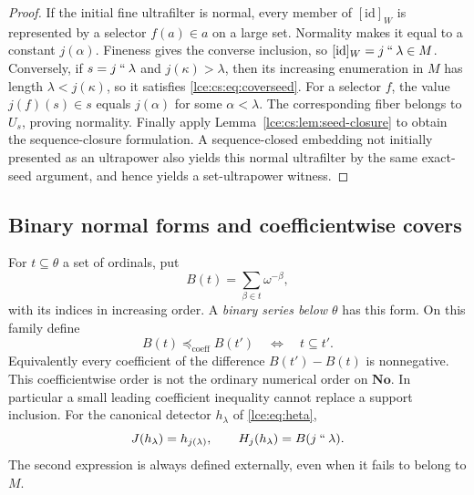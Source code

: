 \documentclass[11pt,letterpaper]{article}
\numberwithin{equation}{section}
\theoremstyle{definition}
\theoremstyle{remark}
\newcommand{\No}{\mathbf{No}}
\newcommand{\imset}[2]{#1\mathbin{``}#2}
\newcommand{\leref}[1]{Lemma~\ref{#1}}
\newcommand{\lecoeff}{\preccurlyeq_{\mathrm{coeff}}}
\begin{document}
\begin{proof}
If the initial fine ultrafilter is normal, every member of
$[\mathrm{id}]_W$ is represented by a selector $f(a)\in a$ on a large set.
Normality makes it equal to a constant $j(\alpha)$. Fineness gives the
converse inclusion, so $[\mathrm{id}]_W=\imset j\lambda\in M$. Conversely, if
$s=\imset j\lambda$ and $j(\kappa)>\lambda$, then its increasing enumeration
in $M$ has length $\lambda<j(\kappa)$, so it satisfies
\eqref{lce:cs:eq:coverseed}. For a selector $f$, the value $j(f)(s)\in s$
equals $j(\alpha)$ for some $\alpha<\lambda$. The corresponding fiber belongs
to $U_s$, proving normality. Finally apply \leref{lce:cs:lem:seed-closure}
to obtain the sequence-closure formulation. A sequence-closed embedding not
initially presented as an ultrapower also yields this normal ultrafilter by
the same exact-seed argument, and hence yields a set-ultrapower witness.
\end{proof}

\subsection{Binary normal forms and coefficientwise covers}
For $t\subseteq\theta$ a set of ordinals, put
\[
 B(t)=\sum_{\beta\in t}\omega^{-\beta},
\]
with its indices in increasing order. A \emph{binary series below $\theta$}
has this form. On this family define
\[
 B(t)\lecoeff B(t')\quad\Longleftrightarrow\quad t\subseteq t'.
\]
Equivalently every coefficient of the difference $B(t')-B(t)$ is
nonnegative. This coefficientwise order is not the ordinary numerical order
on $\No$. In particular a small leading coefficient inequality cannot
replace a support inclusion. For the canonical detector $h_\lambda$ of
\eqref{lce:eq:heta},
\begin{equation}\label{lce:cs:eq:detector-lifts}
 J(h_\lambda)=h_{j(\lambda)},\qquad
 H_j(h_\lambda)=B(\imset j\lambda).
\end{equation}
The second expression is always defined externally, even when it fails to
belong to $M$.
\end{document}
